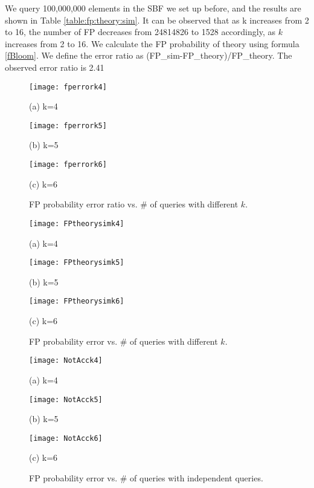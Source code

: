 We query 100,000,000 elements in the SBF we set up before, and the results are shown in Table \ref{table:fp:theory:sim}. It can be observed that as k increases from 2 to 16, the number of FP decreases from 24814826 to 1528 accordingly, as $k$ increases from 2 to 16. We calculate the FP probability of theory using formula \ref{fBloom}. We define the error ratio as (FP\_sim-FP\_theory)/FP\_theory. The observed error ratio is 2.41%




\begin{figure*}[htbp]
\begin{minipage}{0.32\linewidth}
  \centerline{\texttt{[image: fperrork4]}}
  \centerline{(a) k=4}
\end{minipage}
\hfill
\begin{minipage}{0.32\linewidth}
  \centerline{\texttt{[image: fperrork5]}}
  \centerline{(b) k=5}
\end{minipage}
\hfill
\begin{minipage}{0.32\linewidth}
  \centerline{\texttt{[image: fperrork6]}}
  \centerline{(c) k=6}
\end{minipage}
\caption{FP probability error ratio vs. \# of queries with different $k$.}
\label{fig:error:ratio}
\end{figure*}


\begin{figure*}[htbp]
\begin{minipage}{0.32\linewidth}
  \centerline{\texttt{[image: FPtheorysimk4]}}
  \centerline{(a) k=4}
\end{minipage}
\hfill
\begin{minipage}{0.32\linewidth}
  \centerline{\texttt{[image: FPtheorysimk5]}}
  \centerline{(b) k=5}
\end{minipage}
\hfill
\begin{minipage}{0.32\linewidth}
  \centerline{\texttt{[image: FPtheorysimk6]}}
  \centerline{(c) k=6}
\end{minipage}
\caption{FP probability error vs. \# of queries with different $k$.}
\label{fig:error:abso}
\end{figure*}




\begin{figure*}[htbp]
\begin{minipage}{0.32\linewidth}
  \centerline{\texttt{[image: NotAcck4]}}
  \centerline{(a) k=4}
\end{minipage}
\hfill
\begin{minipage}{0.32\linewidth}
  \centerline{\texttt{[image: NotAcck5]}}
  \centerline{(b) k=5}
\end{minipage}
\hfill
\begin{minipage}{0.32\linewidth}
  \centerline{\texttt{[image: NotAcck6]}}
  \centerline{(c) k=6}
\end{minipage}
\caption{FP probability error vs. \# of queries with independent queries.}
\label{fig:error:notAcc}
\end{figure*}



